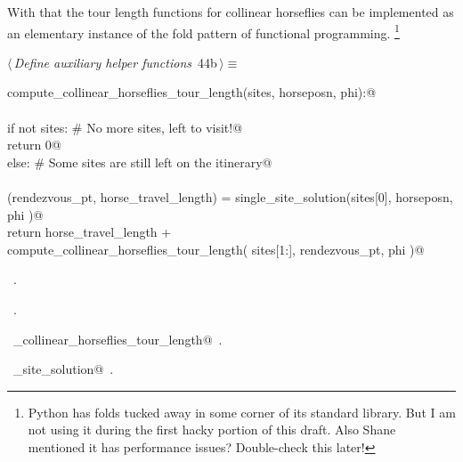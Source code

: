 \documentclass[11.5pt]{report}
\begin{document}
\vspace{-0.8cm}
With that the tour length functions for collinear horseflies can be implemented as 
an elementary instance of the fold pattern of functional programming. 
\footnote{Python has folds tucked away in some corner of its standard library. 
But I am not using it during the first hacky portion of this draft. Also Shane 
mentioned it has performance issues? Double-check this later!}


\begin{flushleft} \small\label{scrap65}\raggedright\small
{} $\langle\,${\itshape Define auxiliary helper functions}\nobreak\ {\footnotesize {44b}}$\,\rangle\equiv$
\vspace{-1ex}
\begin{list}{}{} \item
\mbox{}\verb@def compute_collinear_horseflies_tour_length(sites, horseposn, phi):@\\
\mbox{}\verb@@\\
\mbox{}\verb@     if not sites: # No more sites, left to visit!@\\
\mbox{}\verb@          return 0@\\
\mbox{}\verb@     else:         # Some sites are still left on the itinerary@\\
\mbox{}\verb@@\\
\mbox{}\verb@          (rendezvous_pt, horse_travel_length) = single_site_solution(sites[0], horseposn, phi )@\\
\mbox{}\verb@          return horse_travel_length  + \@\\
\mbox{}\verb@                 compute_collinear_horseflies_tour_length( sites[1:], rendezvous_pt, phi )@\\
\mbox{}\verb@@{\NWsep}
\end{list}
\vspace{-1.5ex}
\footnotesize
\begin{list}{}{\setlength{\itemsep}{-\parsep}\setlength{\itemindent}{-\leftmargin}}
\item \NWtxtMacroDefBy\ .
\item \NWtxtMacroRefIn\ .
\item \NWtxtIdentsDefed\nobreak\  \verb@compute_collinear_horseflies_tour_length@\nobreak\ .\item \NWtxtIdentsUsed\nobreak\  \verb@single_site_solution@\nobreak\ .
\item{}
\end{list}
\vspace{4ex}
\end{flushleft}
\end{document}
